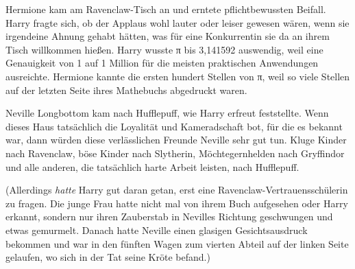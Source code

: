 Hermione kam am Ravenclaw-Tisch an und erntete pflichtbewussten Beifall. Harry fragte sich, ob der Applaus wohl lauter oder leiser gewesen wären, wenn sie irgendeine Ahnung gehabt hätten, was für eine Konkurrentin sie da an ihrem Tisch willkommen hießen. Harry wusste π bis 3,141592 auswendig, weil eine Genauigkeit von 1 auf 1 Million für die meisten praktischen Anwendungen ausreichte. Hermione kannte die ersten hundert Stellen von π, weil so viele Stellen auf der letzten Seite ihres Mathebuchs abgedruckt waren.

Neville Longbottom kam nach Hufflepuff, wie Harry erfreut feststellte. Wenn dieses Haus tatsächlich die Loyalität und Kameradschaft bot, für die es bekannt war, dann würden diese verlässlichen Freunde Neville sehr gut tun. Kluge Kinder nach Ravenclaw, böse Kinder nach Slytherin, Möchtegernhelden nach Gryffindor und alle anderen, die tatsächlich harte Arbeit leisten, nach Hufflepuff.

(Allerdings \emph{hatte} Harry gut daran getan, erst eine Ravenclaw-Vertrauensschülerin zu fragen. Die junge Frau hatte nicht mal von ihrem Buch aufgesehen oder Harry erkannt, sondern nur ihren Zauberstab in Nevilles Richtung geschwungen und etwas gemurmelt. Danach hatte Neville einen glasigen Gesichtsausdruck bekommen und war in den fünften Wagen zum vierten Abteil auf der linken Seite gelaufen, wo sich in der Tat seine Kröte befand.)

